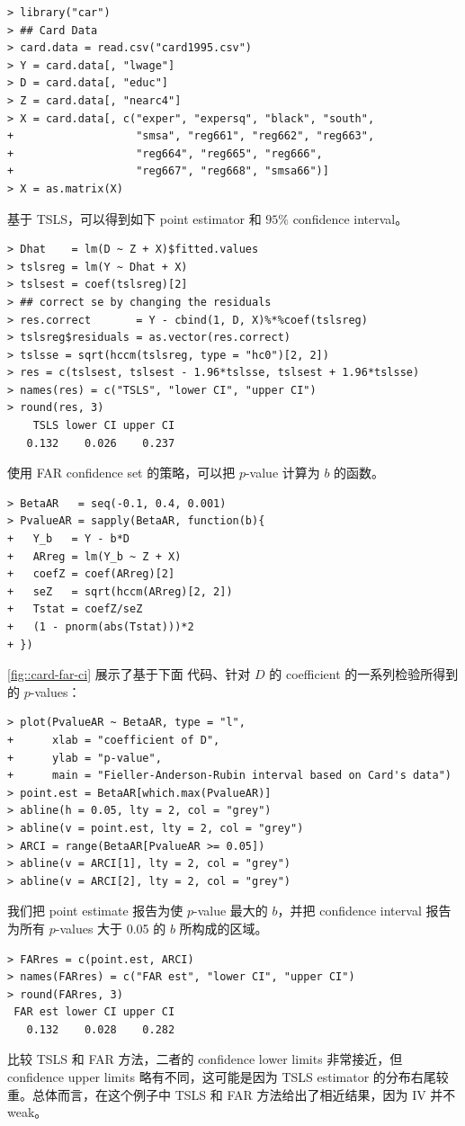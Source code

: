 \begin{lstlisting}
> library("car")
> ## Card Data
> card.data = read.csv("card1995.csv")
> Y = card.data[, "lwage"]
> D = card.data[, "educ"]
> Z = card.data[, "nearc4"]
> X = card.data[, c("exper", "expersq", "black", "south", 
+                   "smsa", "reg661", "reg662", "reg663", 
+                   "reg664", "reg665", "reg666", 
+                   "reg667", "reg668", "smsa66")]
> X = as.matrix(X)
\end{lstlisting}


基于 TSLS，可以得到如下 point estimator 和 $95\%$ confidence interval。 
\begin{lstlisting}
> Dhat    = lm(D ~ Z + X)$fitted.values
> tslsreg = lm(Y ~ Dhat + X)
> tslsest = coef(tslsreg)[2]
> ## correct se by changing the residuals
> res.correct       = Y - cbind(1, D, X)%*%coef(tslsreg)
> tslsreg$residuals = as.vector(res.correct)
> tslsse = sqrt(hccm(tslsreg, type = "hc0")[2, 2])
> res = c(tslsest, tslsest - 1.96*tslsse, tslsest + 1.96*tslsse)
> names(res) = c("TSLS", "lower CI", "upper CI")
> round(res, 3)
    TSLS lower CI upper CI 
   0.132    0.026    0.237 
\end{lstlisting}


使用 FAR confidence set 的策略，可以把 $p$-value 计算为 $b$ 的函数。 
\begin{lstlisting}
> BetaAR   = seq(-0.1, 0.4, 0.001)
> PvalueAR = sapply(BetaAR, function(b){
+   Y_b   = Y - b*D
+   ARreg = lm(Y_b ~ Z + X)
+   coefZ = coef(ARreg)[2]
+   seZ   = sqrt(hccm(ARreg)[2, 2])
+   Tstat = coefZ/seZ
+   (1 - pnorm(abs(Tstat)))*2
+ })
\end{lstlisting}
\cref{fig::card-far-ci} 展示了基于下面  代码、针对 $D$ 的 coefficient 的一系列检验所得到的 $p$-values：
\begin{lstlisting}
> plot(PvalueAR ~ BetaAR, type = "l",
+      xlab = "coefficient of D",
+      ylab = "p-value",
+      main = "Fieller-Anderson-Rubin interval based on Card's data")
> point.est = BetaAR[which.max(PvalueAR)]
> abline(h = 0.05, lty = 2, col = "grey")
> abline(v = point.est, lty = 2, col = "grey")
> ARCI = range(BetaAR[PvalueAR >= 0.05])
> abline(v = ARCI[1], lty = 2, col = "grey")
> abline(v = ARCI[2], lty = 2, col = "grey")
\end{lstlisting}
我们把 point estimate 报告为使 $p$-value 最大的 $b$，并把 confidence interval 报告为所有 $p$-values 大于 0.05 的 $b$ 所构成的区域。 
\begin{lstlisting}
> FARres = c(point.est, ARCI)
> names(FARres) = c("FAR est", "lower CI", "upper CI")
> round(FARres, 3)
 FAR est lower CI upper CI 
   0.132    0.028    0.282
\end{lstlisting}
比较 TSLS 和 FAR 方法，二者的 confidence lower limits 非常接近，但 confidence upper limits 略有不同，这可能是因为 TSLS estimator 的分布右尾较重。总体而言，在这个例子中 TSLS 和 FAR 方法给出了相近结果，因为 IV 并不 weak。 
 


